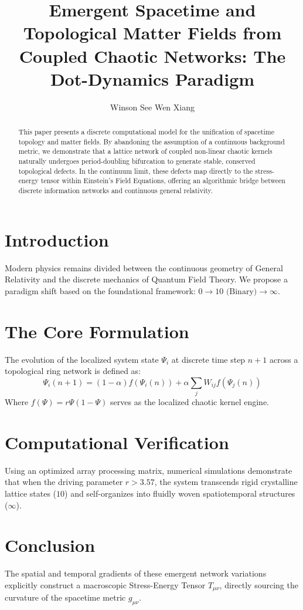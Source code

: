 \documentclass[journal,twocolumn]{IEEEtran}
\begin{document}
\title{Emergent Spacetime and Topological Matter Fields from Coupled Chaotic Networks: The Dot-Dynamics Paradigm}
\author{Winson See Wen Xiang}
\maketitle

\begin{abstract}
This paper presents a discrete computational model for the unification of spacetime topology and matter fields. By abandoning the assumption of a continuous background metric, we demonstrate that a lattice network of coupled non-linear chaotic kernels naturally undergoes period-doubling bifurcation to generate stable, conserved topological defects. In the continuum limit, these defects map directly to the stress-energy tensor within Einstein's Field Equations, offering an algorithmic bridge between discrete information networks and continuous general relativity.
\end{abstract}

\section{Introduction}
Modern physics remains divided between the continuous geometry of General Relativity and the discrete mechanics of Quantum Field Theory. We propose a paradigm shift based on the foundational framework: $0 \rightarrow 10 \text{ (Binary)} \rightarrow \infty$.

\section{The Core Formulation}
The evolution of the localized system state $\Psi_i$ at discrete time step $n+1$ across a topological ring network is defined as:
\begin{equation}
\Psi_i(n+1) = (1-\alpha)f(\Psi_i(n)) + \alpha \sum_{j} W_{ij} f(\Psi_j(n))
\end{equation}
Where $f(\Psi) = r\Psi(1-\Psi)$ serves as the localized chaotic kernel engine.

\section{Computational Verification}
Using an optimized array processing matrix, numerical simulations demonstrate that when the driving parameter $r > 3.57$, the system transcends rigid crystalline lattice states ($10$) and self-organizes into fluidly woven spatiotemporal structures ($\infty$).

\section{Conclusion}
The spatial and temporal gradients of these emergent network variations explicitly construct a macroscopic Stress-Energy Tensor $T_{\mu\nu}$, directly sourcing the curvature of the spacetime metric $g_{\mu\nu}$.
\end{document}
